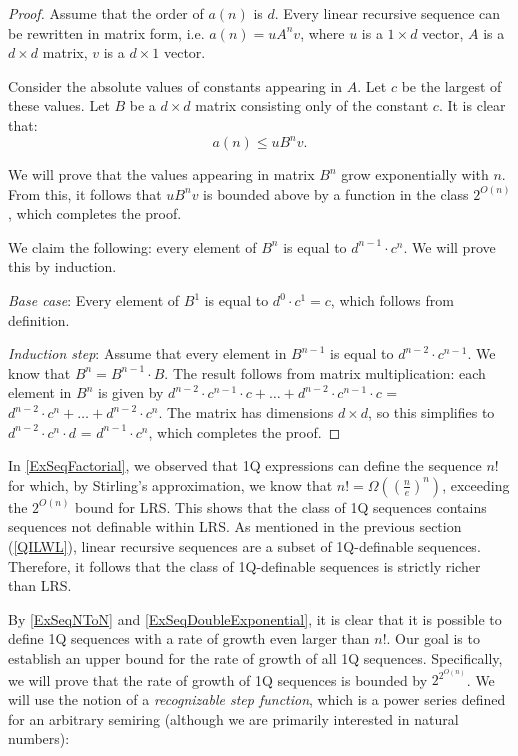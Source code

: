 \documentclass[en]{pracamgr}
\theoremstyle{definition}
\begin{document}
\begin{proof}
    Assume that the order of $a(n)$ is $d$. Every linear recursive sequence can be rewritten in matrix form, i.e. $a(n) = uA^nv$, where $u$ is a $1 \times d$ vector, $A$ is a $d \times d$ matrix, $v$ is a $d \times 1$ vector. 

    Consider the absolute values of constants appearing in $A$. Let $c$ be the largest of these values. Let $B$ be a $d \times d$ matrix consisting only of the constant $c$. It is clear that:
    $$a(n) \leq uB^nv.$$

    We will prove that the values appearing in matrix $B^n$ grow exponentially with $n$. From this, it follows that $uB^nv$ is bounded above by a function in the class $2^{O(n)}$, which completes the proof.

    We claim the following: every element of $B^n$ is equal to $d^{n-1} \cdot c^n$. We will prove this by induction.

    \emph{Base case}: Every element of $B^1$ is equal to $d^0 \cdot c^1 = c$, which follows from definition.

    \emph{Induction step}: Assume that every element in $B^{n-1}$ is equal to $d^{n-2} \cdot c^{n-1}$. We know that $B^n = B^{n-1} \cdot B$. The result follows from matrix multiplication: each element in $B^n$ is given by $d^{n-2} \cdot c^{n-1} \cdot c + \ldots + d^{n-2} \cdot c^{n-1} \cdot c$ = $d^{n-2} \cdot c^n + \ldots + d^{n-2} \cdot c^n$. The matrix has dimensions $d \times d$, so this simplifies to $d^{n-2} \cdot c^n \cdot d$ = $d^{n-1} \cdot c^n$, which completes the proof.
\end{proof}

In \cref{ExSeqFactorial}, we observed that 1Q expressions can define the sequence $n!$ for which, by Stirling's approximation, we know that $n! = \Omega((\frac{n}{e})^n)$, exceeding the $2^{O(n)}$ bound for LRS. This shows that the class of 1Q sequences contains sequences not definable within LRS. As mentioned in the previous section (\ref{QILWL}), linear recursive sequences are a subset of 1Q-definable sequences. Therefore, it follows that the class of 1Q-definable sequences is strictly richer than LRS.

By \cref{ExSeqNToN} and \cref{ExSeqDoubleExponential}, it is clear that it is possible to define 1Q sequences with a rate of growth even larger than $n!$. Our goal is to establish an upper bound for the rate of growth of all 1Q sequences. Specifically, we will prove that the rate of growth of 1Q sequences is bounded by $2^{2^{O(n)}}$. We will use the notion of a \emph{recognizable step function}, which is a power series defined for an arbitrary semiring (although we are primarily interested in natural numbers):
\end{document}
